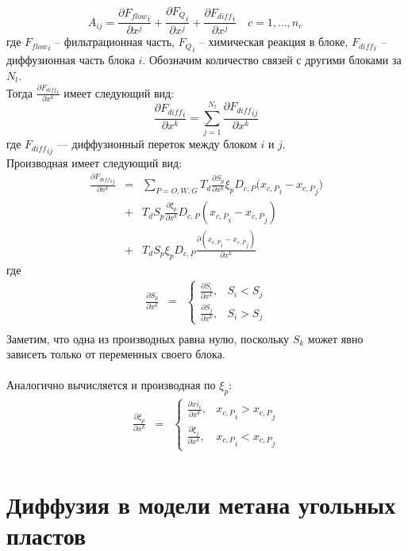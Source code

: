 \documentclass[12pt,a4paper]{article}
\begin{document}
$$A_{ij} = \frac{\partial {{F_{flow}}_i}}{\partial x^j} + \frac{\partial {F_{Q}}_i}{\partial x^j} + \frac {\partial {F_{diff}}_i}{\partial x^j}\quad c=1,\dots,n_c \qquad$$
где ${F_{flow}}_i$ -- фильтрационная часть, ${F_{Q}}_i$ -- химическая реакция в блоке, ${F_{diff}}_i$ -- диффузионная часть блока $i$.
Обозначим количество связей с другими блоками за $N_l$. \\
Тогда $\frac {\partial {F_{diff}}_i}{\partial x^k}$ имеет следующий вид:
$$\frac {\partial {F_{diff}}_i}{\partial x^k} = \sum\limits_{j=1}^{N_l}\frac {\partial {F_{diff}}_{ij}}{\partial x^k}$$
где ${F_{diff}}_{ij}$ --- диффузионный переток между блоком $i$ и $j$.\\
Производная имеет следующий вид:
\begin{eqnarray}
\frac {\partial {F_{diff}}_{ij}}{\partial x^k} &=& \sum\limits_{P = O, W, G}{T_d \frac{\partial S_p}{\partial x^k}\xi_pD_{c,P}({x_{c,P}}_i - {x_{c,P}}_j}) \nonumber
\\&+& T_dS_p\frac {\partial \xi_p}{\partial x^k} D_{c,P}({x_{c,P}}_i - {x_{c,P}}_j)  \nonumber
\\&+& T_dS_p\xi_pD_{c,P}\frac {\partial({x_{c,P}}_i - {x_{c,P}}_j)}{\partial x^k}
\end{eqnarray}
где
\begin{eqnarray}
\frac{\partial S_p}{\partial x^k} &=& \begin{cases} \frac{\partial S_i}{\partial x^k}, & S_i < S_j\\ \frac{\partial S_j}{\partial x^k}, & S_i > S_j \end{cases} \nonumber \\
\end{eqnarray}
Заметим, что одна из производных равна нулю, поскольку $S_k$ может явно зависеть только от переменных своего блока.\\ \\
Аналогично вычисляется и производная по $\xi_p$:
\begin{eqnarray}
\frac{\partial \xi_p}{\partial x^k} &=& \begin{cases} \frac{\partial xi_i}{\partial x^k}, & {x_{c,P}}_i > {x_{c,P}}_j\\ \frac{\partial \xi_j}{\partial x^k}, & {x_{c,P}}_i < {x_{c,P}}_j \end{cases} \nonumber \\
\end{eqnarray}

\section{Диффузия в модели метана угольных пластов}
\end{document}
